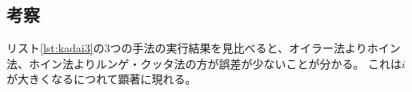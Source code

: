 \documentclass[a4j,titlepage]{jsarticle}
\begin{document}
\subsection{考察}
リスト\ref{lst:kadai3}の3つの手法の実行結果を見比べると、オイラー法よりホイン法、ホイン法よりルンゲ・クッタ法の方が誤差が少ないことが分かる。
これは$i$が大きくなるにつれて顕著に現れる。




\begin{comment}
\begin{figure}[H]
  \centering
  \texttt{[image: 動作原理.pdf]}
  \caption{振り子時計のパーツ}
  \label{fig:parts}
\end{figure}
\end{comment}
\end{document}
